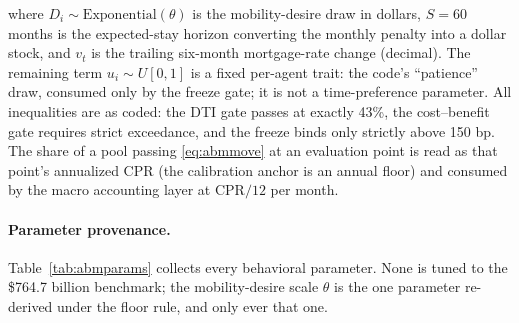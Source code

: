 \documentclass[12pt]{article}
\begin{document}
where $D_i \sim \mathrm{Exponential}(\theta)$ is the mobility-desire draw in dollars, $S = 60$ months is the expected-stay horizon converting the monthly penalty into a dollar stock, and $v_t$ is the trailing six-month mortgage-rate change (decimal). The remaining term $u_i \sim U[0,1]$ is a fixed per-agent trait: the code's ``patience'' draw, consumed only by the freeze gate; it is not a time-preference parameter. %
All inequalities are as coded: the DTI gate passes at exactly 43\%, the cost--benefit gate requires strict exceedance, and the freeze binds only strictly above 150 bp. The share of a pool passing \eqref{eq:abmmove} at an evaluation point is read as that point's annualized CPR (the calibration anchor is an annual floor) and consumed by the macro accounting layer at $\mathrm{CPR}/12$ per month. %

\paragraph{Parameter provenance.}
Table~\ref{tab:abmparams} collects every behavioral parameter. None is tuned to the \$764.7 billion benchmark; the mobility-desire scale $\theta$ is the one parameter re-derived under the floor rule, and only ever that one.
\end{document}

